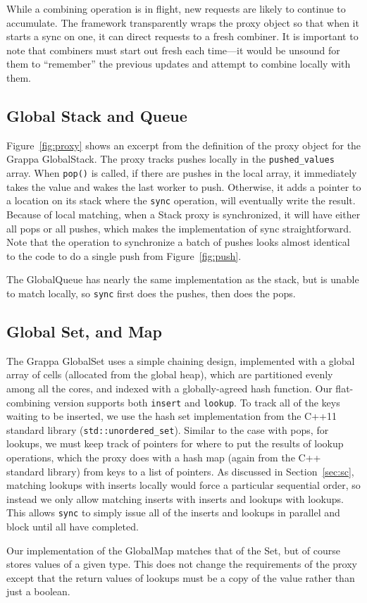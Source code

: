 While a combining operation is in flight, new requests are likely to continue to accumulate. The framework transparently wraps the proxy object so that when it starts a sync on one, it can direct requests to a fresh combiner. It is important to note that combiners must start out fresh each time---it would be unsound for them to ``remember'' the previous updates and attempt to combine locally with them.



\subsection{Global Stack and Queue}
Figure~\ref{fig:proxy} shows an excerpt from the definition of the proxy object for the Grappa GlobalStack. The proxy tracks pushes locally in the \texttt{pushed\_values} array. When \texttt{pop()} is called, if there are pushes in the local array, it immediately takes the value and wakes the last worker to push. Otherwise, it adds a pointer to a location on its stack where the \texttt{sync} operation, will eventually write the result. Because of local matching, when a Stack proxy is synchronized, it will have either all pops or all pushes, which makes the implementation of sync straightforward. Note that the operation to synchronize a batch of pushes looks almost identical to the code to do a single push from Figure~\ref{fig:push}.

The GlobalQueue has nearly the same implementation as the stack, but is unable to match locally, so \texttt{sync} first does the pushes, then does the pops.

\subsection{Global Set, and Map}
The Grappa GlobalSet uses a simple chaining design, implemented with a global array of cells (allocated from the global heap), which are partitioned evenly among all the cores, and indexed with a globally-agreed hash function. Our flat-combining version supports both \texttt{insert} and \texttt{lookup}. To track all of the keys waiting to be inserted, we use the hash set implementation from the C++11 standard library (\texttt{std::unordered\_set}). Similar to the case with pops, for lookups, we must keep track of pointers for where to put the results of lookup operations, which the proxy does with a hash map (again from the C++ standard library) from keys to a list of pointers. As discussed in Section~\ref{sec:sc}, matching lookups with inserts locally would force a particular sequential order, so instead we only allow matching inserts with inserts and lookups with lookups. This allows \texttt{sync} to simply issue all of the inserts and lookups in parallel and block until all have completed.

Our implementation of the GlobalMap matches that of the Set, but of course stores values of a given type. This does not change the requirements of the proxy except that the return values of lookups must be a copy of the value rather than just a boolean.

